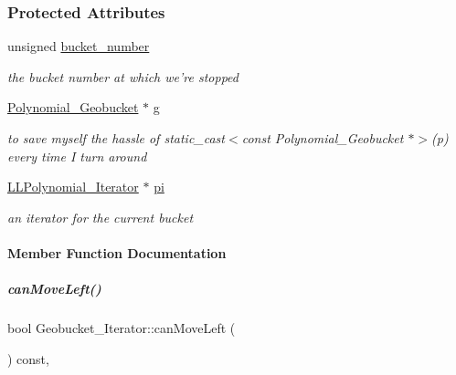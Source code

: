 \subsubsection*{Protected Attributes}
\begin{DoxyCompactItemize}
\item 
\mbox{\label{group___iterator_group_a3a32af8a6cb4d462a3b325721bd2a11b}} 
unsigned \hyperlink{group___iterator_group_a3a32af8a6cb4d462a3b325721bd2a11b}{bucket\+\_\+number}
\begin{DoxyCompactList}\small\item\em the bucket number at which we're stopped \end{DoxyCompactList}\item 
\mbox{\label{group___iterator_group_a17836580130b78ffc1fb62b9bf67c286}} 
\hyperlink{group__polygroup_class_polynomial___geobucket}{Polynomial\+\_\+\+Geobucket} $\ast$ \hyperlink{group___iterator_group_a17836580130b78ffc1fb62b9bf67c286}{g}
\begin{DoxyCompactList}\small\item\em to save myself the hassle of {\ttfamily static\+\_\+cast$<$const Polynomial\+\_\+\+Geobucket $\ast$$>$(p)} every time I turn around \end{DoxyCompactList}\item 
\mbox{\label{group___iterator_group_a484bb97ad82643d5b82733f6cbee8e8c}} 
\hyperlink{group___iterator_group_class_l_l_polynomial___iterator}{L\+L\+Polynomial\+\_\+\+Iterator} $\ast$ \hyperlink{group___iterator_group_a484bb97ad82643d5b82733f6cbee8e8c}{pi}
\begin{DoxyCompactList}\small\item\em an iterator for the current bucket \end{DoxyCompactList}\end{DoxyCompactItemize}


\paragraph{Member Function Documentation}
\mbox{\label{group___iterator_group_a6c3db5961d5faf1b465c51e8935e0b89}} 
\subparagraph{\texorpdfstring{can\+Move\+Left()}{canMoveLeft()}}
{\footnotesize\ttfamily bool Geobucket\+\_\+\+Iterator\+::can\+Move\+Left (\begin{DoxyParamCaption}{ }\end{DoxyParamCaption}) const\hspace{0.3cm}{\ttfamily [override]}, {\ttfamily [virtual]}}

